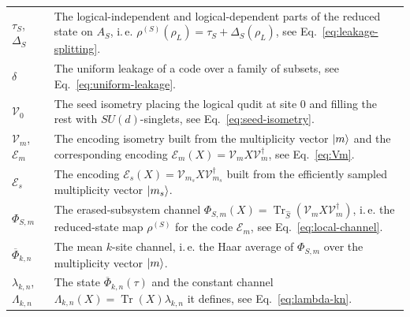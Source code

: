 \documentclass[11pt,letterpaper]{article}
\theoremstyle{plain}
\theoremstyle{plain}
\theoremstyle{plain}
\theoremstyle{plain}
\theoremstyle{plain}
\theoremstyle{plain}
\theoremstyle{plain}
\theoremstyle{definition}
\theoremstyle{plain}
\begin{document}
\begin{tabular}{@{}ll@{}}
\parbox[t]{0.22\textwidth}{$\tau_S$, $\Delta_S$} & \parbox[t]{0.72\textwidth}{The logical-independent and logical-dependent parts of the reduced state on $A_S$, i.\,e. $\rho^{(S)}(\rho_L)=\tau_S+\Delta_S(\rho_L)$, see Eq.~\eqref{eq:leakage-splitting}.} \\[0.6em]

\parbox[t]{0.22\textwidth}{$\delta$} & \parbox[t]{0.72\textwidth}{The uniform leakage of a code over a family of subsets, see Eq.~\eqref{eq:uniform-leakage}.} \\[0.6em]

\parbox[t]{0.22\textwidth}{$\mathcal{V}_0$} & \parbox[t]{0.72\textwidth}{The seed isometry placing the logical qudit at site $0$ and filling the rest with $SU(d)$-singlets, see Eq.~\eqref{eq:seed-isometry}.} \\[0.6em]

\parbox[t]{0.22\textwidth}{$\mathcal{V}_m$, $\mathcal E_m$} & \parbox[t]{0.72\textwidth}{The encoding isometry built from the multiplicity vector $\ket m$ and the corresponding encoding $\mathcal E_m(X)=\mathcal{V}_mX\mathcal{V}_m^\dagger$, see Eq.~\eqref{eq:Vm}.} \\[0.6em]

\parbox[t]{0.22\textwidth}{$\mathcal E_s$} & \parbox[t]{0.72\textwidth}{The encoding $\mathcal E_s(X)=\mathcal{V}_{m_s}X\mathcal{V}_{m_s}^\dagger$ built from the efficiently sampled multiplicity vector $\ket{m_s}$.} \\[0.6em]

\parbox[t]{0.22\textwidth}{$\Phi_{S,m}$} & \parbox[t]{0.72\textwidth}{The erased-subsystem channel $\Phi_{S,m}(X)=\operatorname{Tr}_{\hat S}(\mathcal{V}_mX\mathcal{V}_m^\dagger)$, i.\,e. the reduced-state map $\rho^{(S)}$ for the code $\mathcal E_m$, see Eq.~\eqref{eq:local-channel}.} \\[0.6em]

\parbox[t]{0.22\textwidth}{$\overline\Phi_{k,n}$} & \parbox[t]{0.72\textwidth}{The mean $k$-site channel, i.\,e. the Haar average of $\Phi_{S,m}$ over the multiplicity vector $\ket m$.} \\[0.6em]

\parbox[t]{0.22\textwidth}{$\lambda_{k,n}$, $\Lambda_{k,n}$} & \parbox[t]{0.72\textwidth}{The state $\overline\Phi_{k,n}(\tau)$ and the constant channel $\Lambda_{k,n}(X)=\operatorname{Tr}(X)\lambda_{k,n}$ it defines, see Eq.~\eqref{eq:lambda-kn}.} \\[0.6em]

\end{tabular}
\end{document}

